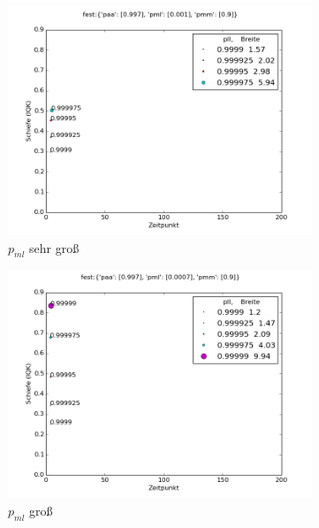 \begin{figure}
\begin{subfigure}[t]{0.5\textwidth}
\includegraphics[width=\textwidth]{bilder/pll/3fest_09_0001_0997_p}
\caption{$p_{ml}$ sehr groß}
\label{einfluss_pll_pml++}
\end{subfigure}
\begin{subfigure}[t]{0.5\textwidth}
\includegraphics[width=\textwidth]{bilder/pll/3fest_09_00007_0997_p}
\caption{$p_{ml}$ groß}
\label{einfluss_pll_pml+}
\end{subfigure}
\vspace*{7mm}
\begin{subfigure}[b]{0.5\textwidth}

\end{subfigure}
\end{figure}
